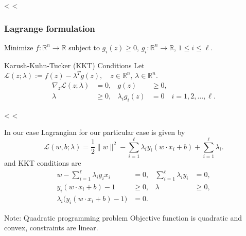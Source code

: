 \documentclass{beamer}
\begin{document}
<%
<%
\begin{frame}[c]\frametitle{Lagrange formulation}
	\begin{block}{}
		Minimize $f: \mathbb{R}^n \to \mathbb{R}$ subject to $g_i(z) \geq 0$, $g_i: \mathbb{R}^n \to \mathbb{R}$, $1\leq i\leq\ell$.
	\end{block}
	\vfill
	{\centering
	\par}
	\vfill
	\begin{block}{Karush-Kuhn-Tucker (KKT) Conditions}
		Let $\mathscr{L}(z;\lambda) := f(z) - \lambda^T g(z), \quad z \in \mathbb{R}^n, \, \lambda \in \mathbb{R}^n$.
		\begin{align*}
			\nabla_{\!\!z} \mathscr{L}(z;\lambda) &= 0, & g(z) &\geq 0, \\
			\lambda &\geq 0, & \lambda_i g_i(z) &= 0 \quad i=1,2,\ldots,\ell.
		\end{align*}	
	\end{block}
\end{frame}

<%
<%
\begin{frame}[c]{In our case}
	Lagrangian for our particular case is given by
	\[
		\mathscr{L}(w,b;\lambda) = \frac{1}{2}\|w\|^2 - \sum_{i=1}^\ell \lambda_i y_i(w\cdot x_i + b) + \sum_{i=1}^\ell \lambda_i.
	\]
	and KKT conditions are
	\begin{align*}
		w - \sum_{i=1}^\ell \lambda_i y_i x_i &= 0, & \sum_{i=1}^\ell \lambda_i y_i &= 0, \\
		y_i(w\cdot x_i + b) - 1 &\geq 0, & \lambda &\geq 0, \\
		\lambda_i \big( y_i (w \cdot x_i + b) - 1\big) &= 0.
	\end{align*}
	\vfill
	\begin{block}{Note: Quadratic programming problem}
		Objective function is quadratic and convex, constraints are linear.
	\end{block}
\end{frame}
\end{document}
